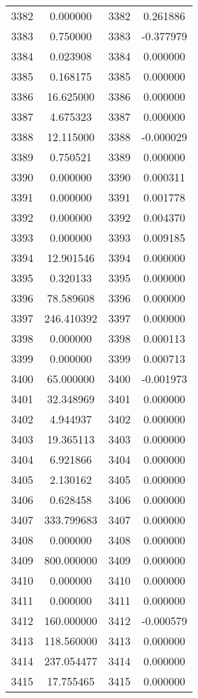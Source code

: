 \documentclass[12pt]{article}
\begin{document}
\begin{longtable}{@{}cccc@{}}
3382 & 0.000000 & 3382 & 0.261886 \\
3383 & 0.750000 & 3383 & -0.377979 \\
3384 & 0.023908 & 3384 & 0.000000 \\
3385 & 0.168175 & 3385 & 0.000000 \\
3386 & 16.625000 & 3386 & 0.000000 \\
3387 & 4.675323 & 3387 & 0.000000 \\
3388 & 12.115000 & 3388 & -0.000029 \\
3389 & 0.750521 & 3389 & 0.000000 \\
3390 & 0.000000 & 3390 & 0.000311 \\
3391 & 0.000000 & 3391 & 0.001778 \\
3392 & 0.000000 & 3392 & 0.004370 \\
3393 & 0.000000 & 3393 & 0.009185 \\
3394 & 12.901546 & 3394 & 0.000000 \\
3395 & 0.320133 & 3395 & 0.000000 \\
3396 & 78.589608 & 3396 & 0.000000 \\
3397 & 246.410392 & 3397 & 0.000000 \\
3398 & 0.000000 & 3398 & 0.000113 \\
3399 & 0.000000 & 3399 & 0.000713 \\
3400 & 65.000000 & 3400 & -0.001973 \\
3401 & 32.348969 & 3401 & 0.000000 \\
3402 & 4.944937 & 3402 & 0.000000 \\
3403 & 19.365113 & 3403 & 0.000000 \\
3404 & 6.921866 & 3404 & 0.000000 \\
3405 & 2.130162 & 3405 & 0.000000 \\
3406 & 0.628458 & 3406 & 0.000000 \\
3407 & 333.799683 & 3407 & 0.000000 \\
3408 & 0.000000 & 3408 & 0.000000 \\
3409 & 800.000000 & 3409 & 0.000000 \\
3410 & 0.000000 & 3410 & 0.000000 \\
3411 & 0.000000 & 3411 & 0.000000 \\
3412 & 160.000000 & 3412 & -0.000579 \\
3413 & 118.560000 & 3413 & 0.000000 \\
3414 & 237.054477 & 3414 & 0.000000 \\
3415 & 17.755465 & 3415 & 0.000000 \\

\end{longtable}
\end{document}

